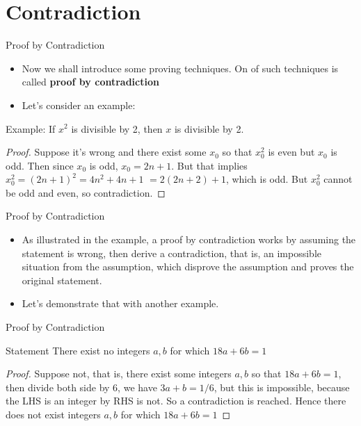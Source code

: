 \documentclass[10pt,xcolor={table,dvipsnames},t]{beamer}
\begin{document}
\section{Contradiction}
\begin{frame}{Proof by Contradiction}
  \begin{itemize}
    \item Now we shall introduce some proving techniques. On of such techniques is called \textbf{proof by contradiction}
    \item Let's consider an example: 
  \end{itemize}
  \begin{exampleblock}{Example:}
    If $x^2$ is divisible by 2, then $x$ is divisible by 2.
    \begin{proof}
      Suppose it's wrong and there exist some $x_0$ so that $x_0^2$ is even but $x_0$ is odd. Then since $x_0$ is odd, $x_0 = 2n+1$. But that implies $x_0^2 = (2n+1)^2 = 4n^2 + 4n + 1$ $= 2(2n+2) + 1$, which is odd. But $x_0^2$ cannot be odd and even, so contradiction.
    \end{proof}
  \end{exampleblock}
\end{frame}

\begin{frame}{Proof by Contradiction}
  \begin{itemize}
    \item As illustrated in the example, a proof by contradiction works by assuming the statement is wrong, then derive a contradiction, that is, an impossible situation from the assumption, which disprove the assumption and proves the original statement.
    \item Let's demonstrate that with another example.
  \end{itemize}
\end{frame}

\begin{frame}{Proof by Contradiction}
  \begin{exampleblock}{Statement}
    There exist no integers $a,b$ for which $18a+6b=1$
    \begin{proof}
      Suppose not, that is, there exist some integers $a,b$ so that $18a+6b=1$, then divide both side by $6$, we have $3a+b=1/6$, but this is impossible, because the LHS is an integer by RHS is not. So a contradiction is reached. Hence there does not exist integers $a,b$ for which $18a+6b=1$
    \end{proof}
  \end{exampleblock}
\end{frame}
\end{document}
